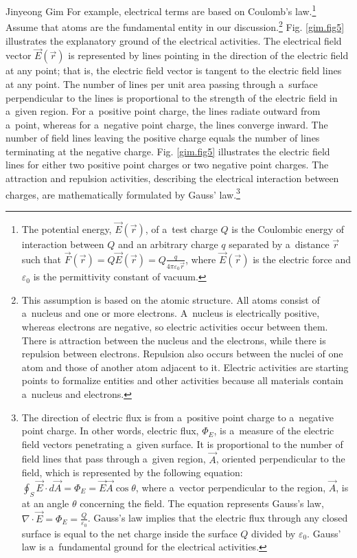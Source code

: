 \begin{artengenv}{Jinyeong Gim}
For example, electrical terms are based on Coulomb's law.\footnote{The potential energy, $\overrightarrow E(\overrightarrow r)$, of a~test charge $Q$ is the Coulombic energy of interaction between $Q$ and an arbitrary charge $q$ separated by a~distance $\overrightarrow r$ such that $\overrightarrow F(\overrightarrow r)=Q\overrightarrow E(\overrightarrow r)=Q\frac q{4\pi \varepsilon_0\overrightarrow r}$, where $\overrightarrow E(\overrightarrow r)$ is the electric force and $\varepsilon_0$ is the permittivity constant of vacuum.} Assume that atoms are the fundamental entity in our discussion.\footnote{This assumption is based on the atomic structure. All atoms consist of a~nucleus and one or more electrons. A~nucleus is electrically positive, whereas electrons are negative, so electric activities occur between them. There is attraction between the nucleus and the electrons, while there is repulsion between electrons. Repulsion also occurs between the nuclei of one atom and those of another atom adjacent to it. Electric activities are starting points to formalize entities and other activities because all materials contain a~nucleus and electrons.} Fig. \ref{gim.fig5} illustrates the explanatory ground of the electrical activities. The electrical field vector $\overrightarrow E(\overrightarrow r)$ is represented by lines pointing in the direction of the electric field at any point; that is, the electric field vector is tangent to the electric field lines at any point. The number of lines per unit area passing through a~surface perpendicular to the lines is proportional to the strength of the electric field in a~given region. For a~positive point charge, the lines radiate outward from a~point, whereas for a~negative point charge, the lines converge inward. The number of field lines leaving the positive charge equals the number of lines terminating at the negative charge. Fig. \ref{gim.fig5} illustrates the electric field lines for either two positive point charges or two negative point charges. The attraction and repulsion activities, describing the electrical interaction between charges, are mathematically formulated by Gauss' law.\footnote{The direction of electric flux is from a~positive point charge to a~negative point charge. In other words, electric flux, $\Phi _E$, is a~measure of the electric field vectors penetrating a~given surface. It is proportional to the number of field lines that pass through a~given region, $\overrightarrow A$, oriented perpendicular to the field, which is represented by the following equation: $\oint _S \overrightarrow E{\cdot}d\overrightarrow A=\Phi _E=\overrightarrow E\overrightarrow A\cos \theta $, where a~vector perpendicular to the region, $\overrightarrow A$, is at an angle $\theta $ concerning the field. The equation represents Gauss's law, ${\nabla}{\cdot}\overrightarrow E=\Phi _E=\frac Q{\varepsilon _0}$. Gauss's law implies that the electric flux through any closed surface is equal to the net charge inside the surface $Q$ divided by $\varepsilon _0$. Gauss' law is a~fundamental ground for the electrical activities.}


\end{artengenv}
